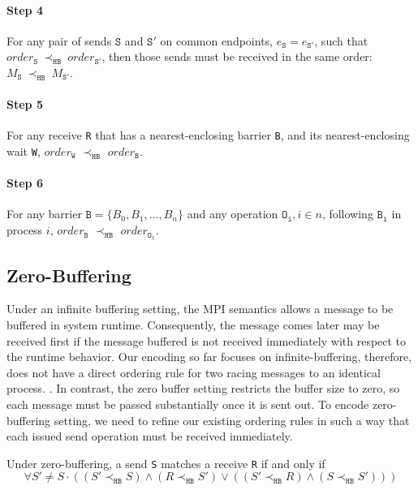\paragraph*{Step 4} For any pair of sends $\mathtt{S}$ and
$\mathtt{S'}$ on common endpoints, $e_{\mathtt{S}}=e_{\mathtt{S'}}$,
such that
$\mathit{order}_\mathtt{S}\ \mathrm{\prec_\mathtt{HB}}\ \mathit{order}_\mathtt{S'}$,
then those sends must be received in the same order:
$M_{\mathtt{S}}\ \mathrm{\prec_{\mathtt{HB}}}\ M_{\mathtt{S'}}$.

\paragraph*{Step 5} For any receive \texttt{R} that has a nearest-enclosing barrier \texttt{B}, and its nearest-enclosing wait \texttt{W}, $\mathit{order}_\mathtt{W}$
$\prec_\mathtt{HB}$ $\mathit{order}_\mathtt{B}$.

\paragraph*{Step 6} For any barrier $\mathtt{B} = \{B_0, B_1, ..., B_n\}$ and any operation $\mathtt{O_i}, i\in n$, following $\mathtt{B_i}$ in process $i$, $\mathit{order}_\mathtt{B}$
$\prec_\mathtt{HB}$ $\mathit{order}_\mathtt{O_i}$.

\subsection{Zero-Buffering}
Under an infinite buffering setting, the MPI semantics allows a message to be buffered in system runtime. Consequently, the message comes later may be received first if the message buffered is not received immediately with respect to the runtime behavior. Our encoding so far focuses on infinite-buffering, therefore, does not have a direct ordering rule for two racing messages to an identical process. 
. In contrast, the zero buffer setting restricts the buffer size to zero, so each message must be passed substantially once it is sent out. To encode zero-buffering setting, we need to refine our existing ordering rules in such a way that each issued send operation must be received immediately. 

\begin{definition}
Under zero-buffering, a send \texttt{S} matches a receive \texttt{R} if and only if
\begin{equation*}
\forall S'\neq S \cdot( (S' \mathrm{\prec_\mathtt{HB}} S) \wedge (R \mathrm{\prec_\mathtt{HB}} S') 
                         \vee ((S' \mathrm{\prec_\mathtt{HB}} R) \wedge (S \mathrm{\prec_\mathtt{HB}} S')))
\end{equation*}
 
\end{definition}

